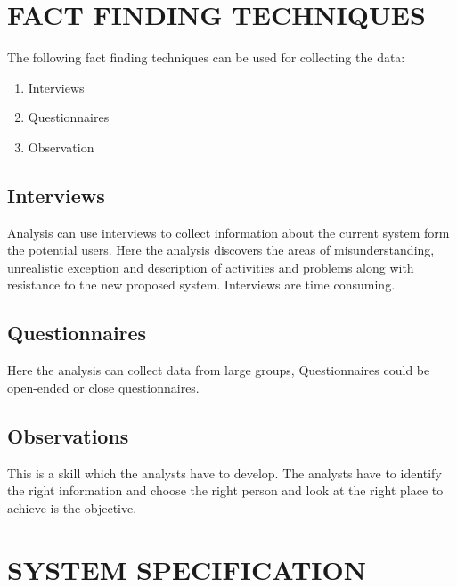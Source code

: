 \documentclass[a4paper,12pt]{article}
\begin{document}
\section{FACT FINDING TECHNIQUES}\vspace{5mm}
The following fact finding techniques can be used for collecting the data:
\begin{enumerate}
\item Interviews 
\item Questionnaires
\item Observation
\end{enumerate}
\subsection{Interviews}\vspace{2mm}
\par\vspace{2mm}
 Analysis can use interviews to collect information about the current system form the potential users. Here the analysis discovers the areas of misunderstanding, unrealistic exception and description of activities and problems along with resistance to the new proposed system. Interviews are time consuming.
\subsection{Questionnaires}\vspace{2mm} 
 Here the analysis can collect data from large groups, Questionnaires could be open-ended or close questionnaires.
\subsection{Observations}\vspace{2mm} 
 This is a skill which the analysts have to develop. The analysts have to identify the right information and choose the right person and look at the right place to achieve is the objective.

\newpage
\section{SYSTEM SPECIFICATION}\vspace{5mm}
\end{document}
